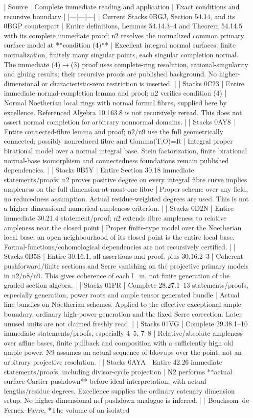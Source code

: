 \documentclass[11pt]{article}
\begin{document}
| Source | Complete immediate reading and application | Exact conditions and recursive boundary | |---|---|---| | Current Stacks 0BGJ, Section 54.14, and its 0BGP counterpart | Entire definitions, Lemmas 54.14.3--4 and Theorem 54.14.5 with its complete immediate proof; n2 resolves the normalized common primary surface model at **condition (4)** | Excellent integral normal surfaces: finite normalization, finitely many singular points, each singular completion normal. The immediate (4)\ensuremath{\to}(3) proof uses complete-ring resolution, rational-singularity and gluing results; their recursive proofs are published background. No higher-dimensional or characteristic-zero restriction is inserted. | | Stacks 0C23 | Entire immediate normal-completion lemma and proof; n2 verifies condition (4) | Normal Noetherian local rings with normal formal fibres, supplied here by excellence. Referenced Algebra 10.163.8 is not recursively reread. This does not assert normal completion for arbitrary nonnormal domains. | | Stacks 0AY8 | Entire connected-fibre lemma and proof; n2/n9 use the full geometrically connected, possibly nonreduced fibre and Gamma(T,O)=R | Integral proper birational model over a normal integral base. Stein factorization, finite birational normal-base isomorphism and connectedness foundations remain published dependencies. | | Stacks 0B5Y | Entire Section 30.18 immediate statements/proofs; n2 proves positive degree on every integral fibre curve implies ampleness on the full dimension-at-most-one fibre | Proper scheme over any field, no reducedness assumption. Actual residue-weighted degrees are used. This is not a higher-dimensional numerical ampleness criterion. | | Stacks 0D2N | Entire immediate 30.21.4 statement/proof; n2 extends fibre ampleness to relative ampleness near the closed point | Proper finite-type model over the Noetherian local base; an open neighbourhood of its closed point is the entire local base. Formal-functions/cohomological dependencies are not recursively certified. | | Stacks 0B5S | Entire 30.16.1, all assertions and proof, plus 30.16.2--3 | Coherent pushforward/finite sections and Serre vanishing on the projective primary models in n2/n8/n9. This gives coherence of each I\_m, not finite generation of the graded section algebra. | | Stacks 01PR | Complete 28.27.1--13 statements/proofs, especially generation, power roots and ample tensor generated bundle | Actual line bundles on Noetherian schemes. Applied to the effective exceptional ample boundary, ordinary high-power generation and the fixed Serre correction. Later unused units are not claimed freshly read. | | Stacks 01VG | Complete 29.38.1--10 immediate statements/proofs, especially 4--5, 7--8 | Relative/absolute ampleness over affine bases, finite pullback and composition with a sufficiently high old ample power. N9 assumes an actual sequence of blowups over the point, not an arbitrary projective resolution. | | Stacks 0AYA | Entire 42.26 immediate statements/proofs, including divisor-cycle projection | N2 performs **actual surface Cartier pushdown** before ideal interpretation, with actual lengths/residue degrees. Excellence supplies the ordinary catenary dimension setup. No higher-dimensional nef pushdown analogue is inferred. | | Boucksom--de Fernex--Favre, *The volume of an isolated 
\end{document}
